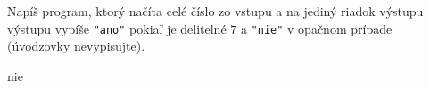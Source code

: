 




Napíš program, ktorý načíta celé číslo zo vstupu a na jediný riadok výstupu výstupu vypíše
\texttt{"ano"} pokiaľ je delitelné $7$ a \texttt{"nie"} v opačnom prípade (úvodzovky
nevypisujte).

\vystup
nie
\koniec


